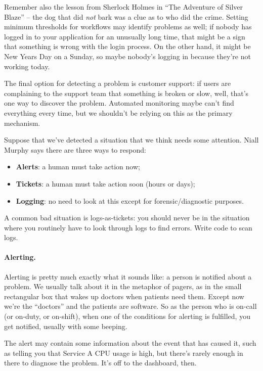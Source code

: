 \documentclass[a4paper]{report}
\begin{document}
Remember also the lesson from Sherlock Holmes in ``The Adventure of Silver Blaze'' -- the dog that did \textit{not} bark was a clue as to who did the crime. Setting minimum thresholds for workflows may identify problems as well; if nobody has logged in to your application for an unusually long time, that might be a sign that something is wrong with the login process. On the other hand, it might be New Years Day on a Sunday, so maybe nobody's logging in because they're not working today.

The final option for detecting a problem is customer support: if users are complaining to the support team that something is broken or slow, well, that's one way to discover the problem. Automated monitoring maybe can't find everything every time, but we shouldn't be relying on this as the primary mechanism.

Suppose that we've detected a situation that we think needs some attention. Niall Murphy says there are three ways to respond:

\begin{itemize}
\item {\bf Alerts}: a human must take action now;
\item {\bf Tickets}: a human must take action soon (hours or days);
\item {\bf Logging}: no need to look at this except for forensic/diagnostic purposes.
\end{itemize}

A common bad situation is logs-as-tickets: you should never be in the
situation where you routinely have to look through logs to find
errors. Write code to scan logs.

\paragraph{Alerting.}
Alerting is pretty much exactly what it sounds like: a person is notified about a problem. We usually talk about it in the metaphor of pagers, as in the small rectangular box that wakes up doctors when patients need them. Except now we're the ``doctors'' and the patients are software. So as the person who is on-call (or on-duty, or on-shift), when one of the conditions for alerting is fulfilled, you get notified, usually with some beeping. 

The alert may contain some information about the event that has caused it, such as telling you that Service A CPU usage is high, but there's rarely enough in there to diagnose the problem. It's off to the dashboard, then.
\end{document}
